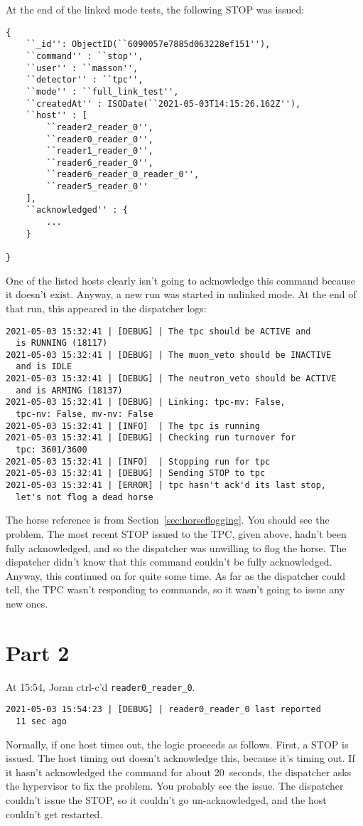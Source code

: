At the end of the linked mode tests, the following STOP was issued:
\begin{verbatim}
{
    ``_id'': ObjectID(``6090057e7885d063228ef151''),
    ``command'' : ``stop'',
    ``user'' : ``masson'',
    ``detector'' : ``tpc'',
    ``mode'' : ``full_link_test'',
    ``createdAt'' : ISODate(``2021-05-03T14:15:26.162Z''),
    ``host'' : [
        ``reader2_reader_0'',
        ``reader0_reader_0'',
        ``reader1_reader_0'',
        ``reader6_reader_0'',
        ``reader6_reader_0_reader_0'',
        ``reader5_reader_0''
    ],
    ``acknowledged'' : {
        ...
    }

}
\end{verbatim}
One of the listed hosts clearly isn't going to acknowledge this command because it doesn't exist.
Anyway, a new run was started in unlinked mode.
At the end of that run, this appeared in the dispatcher logs:
\begin{verbatim}
2021-05-03 15:32:41 | [DEBUG] | The tpc should be ACTIVE and
  is RUNNING (18117)
2021-05-03 15:32:41 | [DEBUG] | The muon_veto should be INACTIVE
  and is IDLE
2021-05-03 15:32:41 | [DEBUG] | The neutron_veto should be ACTIVE
  and is ARMING (18137)
2021-05-03 15:32:41 | [DEBUG] | Linking: tpc-mv: False,
  tpc-nv: False, mv-nv: False
2021-05-03 15:32:41 | [INFO]  | The tpc is running
2021-05-03 15:32:41 | [DEBUG] | Checking run turnover for
  tpc: 3601/3600
2021-05-03 15:32:41 | [INFO]  | Stopping run for tpc
2021-05-03 15:32:41 | [DEBUG] | Sending STOP to tpc
2021-05-03 15:32:41 | [ERROR] | tpc hasn't ack'd its last stop,
  let's not flog a dead horse
\end{verbatim}

The horse reference is from Section~\ref{sec:horseflogging}.
You should see the problem.
The most recent STOP issued to the TPC, given above, hadn't been fully acknowledged, and so the dispatcher was unwilling to flog the horse.
The dispatcher didn't know that this command couldn't be fully acknowledged.
Anyway, this continued on for quite some time.
As far as the dispatcher could tell, the TPC wasn't responding to commands, so it wasn't going to issue any new ones.

\section{Part 2}

At 15:54, Joran ctrl-c'd \texttt{reader0\_reader\_0}.
\begin{verbatim}
2021-05-03 15:54:23 | [DEBUG] | reader0_reader_0 last reported
  11 sec ago
\end{verbatim}
Normally, if one host times out, the logic proceeds as follows.
First, a STOP is issued.
The host timing out doesn't acknowledge this, because it's timing out.
If it hasn't acknowledged the command for about 20~seconds, the dispatcher asks the hypervisor to fix the problem.
You probably see the issue.
The dispatcher couldn't issue the STOP, so it couldn't go un-acknowledged, and the host couldn't get restarted.

